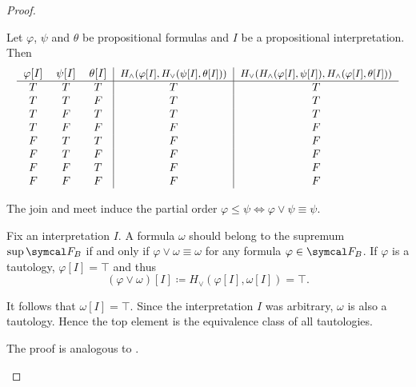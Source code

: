 \begin{proof}
\begin{description}
     Let \( \varphi \), \( \psi \) and \( \theta \) be propositional formulas and \( I \) be a propositional interpretation. Then
    \begin{equation*}
      \begin{tabular}{c c c | c | c}
        \( \varphi[I] \) & \( \psi[I] \) & \( \theta[I] \) & \small{\( H_\land(\varphi[I], H_\lor(\psi[I], \theta[I])) \)} & \small{\( H_\lor(H_\land(\varphi[I], \psi[I]), H_\land(\varphi[I], \theta[I])) \)} \\
        \hline
        \( T \)          & \( T \)       & \( T \)         & \( T \)                                               & \( T \)    \\
        \( T \)          & \( T \)       & \( F \)         & \( T \)                                               & \( T \)    \\
        \( T \)          & \( F \)       & \( T \)         & \( T \)                                               & \( T \)    \\
        \( T \)          & \( F \)       & \( F \)         & \( F \)                                               & \( F \)    \\
        \( F \)          & \( T \)       & \( T \)         & \( F \)                                               & \( F \)    \\
        \( F \)          & \( T \)       & \( F \)         & \( F \)                                               & \( F \)    \\
        \( F \)          & \( F \)       & \( T \)         & \( F \)                                               & \( F \)    \\
        \( F \)          & \( F \)       & \( F \)         & \( F \)                                               & \( F \)
      \end{tabular}
    \end{equation*}
  \end{description}

  The join and meet induce the partial order \( \varphi \leq \psi \iff \varphi \lor \psi \equiv \psi \).

  \begin{description}
     Fix an interpretation \( I \). A formula \( \omega \) should belong to the supremum \( \sup \Cal{F}_B \) if and only if \( \varphi \lor \omega \equiv \omega \) for any formula \( \varphi \in \Cal{F}_B \). If \( \varphi \) is a tautology, \( \varphi[I] = \top \) and thus
    \begin{equation*}
      (\varphi \lor \omega)[I] \coloneqq H_\lor(\varphi[I], \omega[I]) = \top.
    \end{equation*}

    It follows that \( \omega[I] = \top \). Since the interpretation \( I \) was arbitrary, \( \omega \) is also a tautology. Hence the top element is the equivalence class of all tautologies.

     The proof is analogous to .
  \end{description}
\end{proof}

